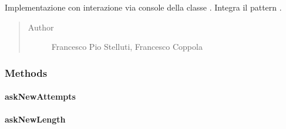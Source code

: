 \documentclass[letterpaper,10pt,italian,openany,oneside]{sphinxmanual}
\begin{document}
\begin{fulllineitems}
\label{\detokenize{test/it/unicam/cs/pa/mastermind/ui/ConsoleStartView:it.unicam.cs.pa.mastermind.ui.ConsoleStartView}}
Implementazione con interazione via console della classe . Integra il pattern .
\begin{quote}\begin{description}
\item[{Author}] \leavevmode
Francesco Pio Stelluti, Francesco Coppola

\end{description}\end{quote}

\end{fulllineitems}



\subsubsection{Methods}
\label{\detokenize{test/it/unicam/cs/pa/mastermind/ui/ConsoleStartView:methods}}

\paragraph{askNewAttempts}
\label{\detokenize{test/it/unicam/cs/pa/mastermind/ui/ConsoleStartView:asknewattempts}}

\begin{fulllineitems}
\label{\detokenize{test/it/unicam/cs/pa/mastermind/ui/ConsoleStartView:it.unicam.cs.pa.mastermind.ui.ConsoleStartView.askNewAttempts(int)}}
\end{fulllineitems}



\paragraph{askNewLength}
\label{\detokenize{test/it/unicam/cs/pa/mastermind/ui/ConsoleStartView:asknewlength}}
\end{document}

